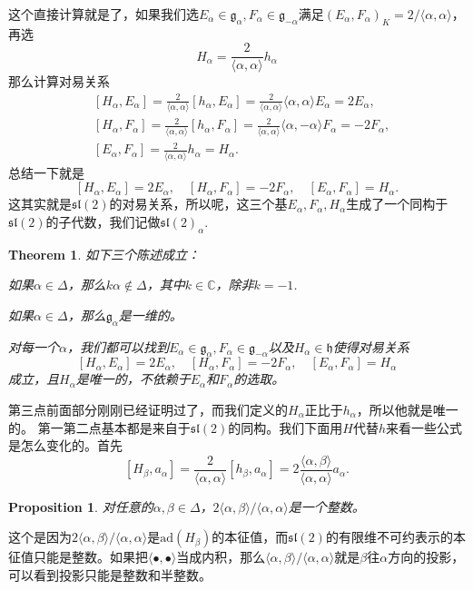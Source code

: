\documentclass[8pt]{book}
\theoremstyle{plain}
\newtheorem{pro}[defi]{Proposition}
\newtheorem{theo}[defi]{Theorem}
\newcommand{\cc}{\mathbb{C}}
\newcommand{\lag}{{\mathfrak{g}}}  %
\newcommand{\ad}{{\mathrm{ad}}}
\begin{document}
这个直接计算就是了，如果我们选$E_\alpha\in\lag_\alpha,F_\alpha\in\lag_{-\alpha}$满足$(E_\alpha,F_{\alpha})_K=2/\langle \alpha,\alpha \rangle$，再选
\[
	H_\alpha=\frac{2}{\langle \alpha,\alpha \rangle}h_\alpha
\]
那么计算对易关系
\[
	\begin{split}
	&[H_\alpha,E_\alpha]=\frac{2}{\langle \alpha,\alpha \rangle}[h_\alpha,E_\alpha]=\frac{2}{\langle \alpha,\alpha \rangle}\langle \alpha,\alpha \rangle E_\alpha=2E_\alpha,\\
	&[H_\alpha,F_\alpha]=\frac{2}{\langle \alpha,\alpha \rangle}[h_\alpha,F_\alpha]=\frac{2}{\langle \alpha,\alpha \rangle}\langle \alpha,-\alpha \rangle F_\alpha=-2F_\alpha,\\
	&[E_\alpha,F_\alpha]=\frac{2}{\langle \alpha,\alpha \rangle}h_\alpha=H_\alpha.
	\end{split}
\]
总结一下就是
\[
	[H_\alpha,E_\alpha]=2E_\alpha,\quad[H_\alpha,F_\alpha]=-2F_\alpha,\quad[E_\alpha,F_\alpha]=H_\alpha.
\]
这其实就是$\mathfrak{sl}(2)$的对易关系，所以呢，这三个基$E_\alpha,F_\alpha,H_\alpha$生成了一个同构于$\mathfrak{sl}(2)$的子代数，我们记做$\mathfrak{sl}(2)_\alpha$.\

\begin{theo}
如下三个陈述成立：

如果$\alpha\in\Delta$，那么$k\alpha\notin \Delta$，其中$k\in \cc$，除非$k=-1$.

如果$\alpha\in\Delta$，那么$\lag_\alpha$是一维的。

对每一个$\alpha$，我们都可以找到$E_\alpha\in\lag_\alpha,F_\alpha\in\lag_{-\alpha}$以及$H_\alpha\in\mathfrak{h}$使得对易关系
\[
[H_\alpha,E_\alpha]=2E_\alpha,\quad[H_\alpha,F_\alpha]=-2F_\alpha,\quad[E_\alpha,F_\alpha]=H_\alpha
\]
成立，且$H_\alpha$是唯一的，不依赖于$E_\alpha$和$F_\alpha$的选取。
\end{theo}
第三点前面部分刚刚已经证明过了，而我们定义的$H_\alpha$正比于$h_\alpha$，所以他就是唯一的。
第一第二点基本都是来自于$\mathfrak{sl}(2)$的同构。我们下面用$H$代替$h$来看一些公式是怎么变化的。首先
\[
	[H_\beta,a_\alpha]=\frac{2}{\langle \alpha,\alpha \rangle}[h_\beta,a_\alpha]=2\frac{\langle \alpha,\beta \rangle}{\langle \alpha,\alpha \rangle} a_\alpha.
\]
\begin{pro}
对任意的$\alpha,\beta\in \Delta$，$2\langle \alpha,\beta \rangle/\langle \alpha,\alpha \rangle$是一个整数。
\end{pro}
这个是因为$2\langle \alpha,\beta \rangle/\langle \alpha,\alpha \rangle$是$\ad(H_\beta)$的本征值，而$\mathfrak{sl}(2)$的有限维不可约表示的本征值只能是整数。如果把$\langle \bullet,\bullet \rangle$当成内积，那么$\langle \alpha,\beta \rangle/\langle \alpha,\alpha \rangle$就是$\beta$往$\alpha$方向的投影，可以看到投影只能是整数和半整数。
\end{document}
